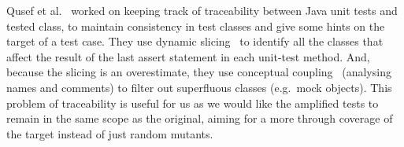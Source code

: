 \documentclass[a4paper,11pt]{sdm_internship}
\newcommand{\todo}[1]{\colorbox{Red!75}{\textcolor{white}{\textbf{TODO\ifx&#1&\else: #1\fi}}}}
\theoremstyle{definition}
\begin{document}
Qusef et al.~\cite{qusef2011scotch} worked on keeping track of traceability between Java unit tests and tested class, to maintain consistency in test classes and give some hints on the target of a test case.
They use dynamic slicing~\cite{korel1988dynamic} to identify all the classes that affect the result of the last assert statement in each unit-test method.
And, because the slicing is an overestimate, they use conceptual coupling~\cite{poshyvanyk2009using} (analysing names and comments) to filter out superfluous classes (e.g.\ mock objects).
This problem of traceability is useful for us as we would like the amplified tests to remain in the same scope as the original, aiming for a more through coverage of the target instead of just random mutants.
\end{document}
